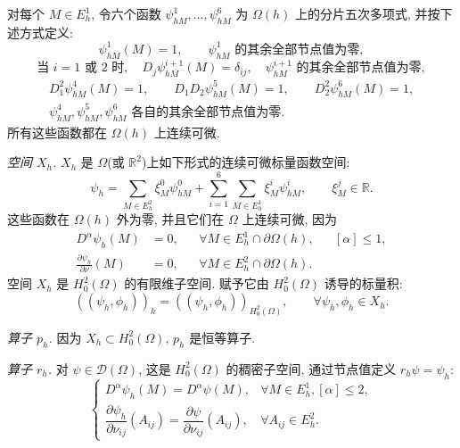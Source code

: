 对每个 $M\in E_h^1$, 令六个函数 $\psi_{hM}^1,\ldots,\psi_{hM}^6$ 为 $\Omega(h)$ 上的分片五次多项式, 并按下述方式定义:
\begin{equation}
\psi_{hM}^1(M)=1,
\qquad \psi_{hM}^1\text{ 的其余全部节点值为零},
\label{eq:ch1-apx4-vertex-basis-value}
\end{equation}
\begin{equation}
\text{当 }i=1\text{ 或 }2\text{ 时},
\quad D_j\psi_{hM}^{i+1}(M)=\delta_{ij},
\quad \psi_{hM}^{i+1}\text{ 的其余全部节点值为零},
\label{eq:ch1-apx4-vertex-basis-first}
\end{equation}
\begin{equation}
\begin{gathered}
D_1^2\psi_{hM}^4(M)=1,
\qquad D_1D_2\psi_{hM}^5(M)=1,
\qquad D_2^2\psi_{hM}^6(M)=1,\\
\psi_{hM}^4,\psi_{hM}^5,\psi_{hM}^6
\text{ 各自的其余全部节点值为零}.
\end{gathered}
\label{eq:ch1-apx4-vertex-basis-second}
\end{equation}
所有这些函数都在 $\Omega(h)$ 上连续可微.

\emph{空间 $X_h$.} $X_h$ 是 $\Omega$(或 $\mathbb R^2$)上如下形式的连续可微标量函数空间:
\begin{equation}
\psi_h=\sum_{M\in E_h^2}\xi_M^0\psi_{hM}^0
+\sum_{i=1}^6\sum_{M\in E_h^1}\xi_M^i\psi_{hM}^i,
\qquad \xi_M^j\in\mathbb R.
\label{eq:ch1-apx4-xh-expansion}
\end{equation}
这些函数在 $\Omega(h)$ 外为零, 并且它们在 $\Omega$ 上连续可微, 因为
\begin{equation}
\begin{aligned}
D^\alpha\psi_h(M)&=0,
&&\forall M\in E_h^1\cap\partial\Omega(h),
&&[\alpha]\leq1,\\
\frac{\partial\psi_h}{\partial\nu}(M)&=0,
&&\forall M\in E_h^2\cap\partial\Omega(h).
\end{aligned}
\label{eq:ch1-apx4-boundary-nodal-data}
\end{equation}
空间 $X_h$ 是 $H_0^2(\Omega)$ 的有限维子空间. 赋予它由 $H_0^2(\Omega)$ 诱导的标量积:
\begin{equation}
((\psi_h,\phi_h))_h=((\psi_h,\phi_h))_{H_0^2(\Omega)},
\qquad\forall\psi_h,\phi_h\in X_h.
\label{eq:ch1-apx4-xh-product}
\end{equation}

\emph{算子 $p_h$.} 因为 $X_h\subset H_0^2(\Omega)$, $p_h$ 是恒等算子.

\emph{算子 $r_h$.} 对 $\psi\in\mathcal D(\Omega)$, 这是 $H_0^2(\Omega)$ 的稠密子空间, 通过节点值定义 $r_h\psi=\psi_h$:
\begin{equation}
\begin{cases}
D^\alpha\psi_h(M)=D^\alpha\psi(M),
&\forall M\in E_h^1, [\alpha]\leq2,\\
\dfrac{\partial\psi_h}{\partial\nu_{ij}}(A_{ij})
=\dfrac{\partial\psi}{\partial\nu_{ij}}(A_{ij}),
&\forall A_{ij}\in E_h^2.
\end{cases}
\label{eq:ch1-apx4-restriction}
\end{equation}

